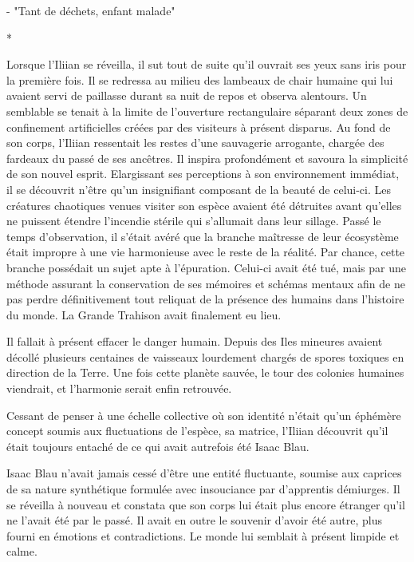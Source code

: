 \documentclass[12pt]{book}
\newcommand{\s}{\begin{center}
*
\end{center}
}
\begin{document}
- "Tant de déchets, enfant malade"

\s

Lorsque l'Iliian se réveilla, il sut tout de suite qu'il ouvrait ses yeux sans iris pour la première fois. Il se redressa au milieu des lambeaux de chair humaine qui lui avaient servi de paillasse durant sa nuit de repos et observa alentours. Un semblable se tenait à la limite de l'ouverture rectangulaire séparant deux zones de confinement artificielles créées par des visiteurs à présent disparus. Au fond de son corps, l'Iliian ressentait les restes d'une sauvagerie arrogante, chargée des fardeaux du passé de ses ancêtres. Il inspira profondément et savoura la simplicité de son nouvel esprit. Elargissant ses perceptions à son environnement immédiat, il se découvrit n'être qu'un insignifiant composant de la beauté de celui-ci. Les créatures chaotiques venues visiter son espèce avaient été détruites avant qu'elles ne puissent étendre l'incendie stérile qui s'allumait dans leur sillage. Passé le temps d'observation, il s’était avéré que la branche maîtresse de leur écosystème était impropre à une vie harmonieuse avec le reste de la réalité. Par chance, cette branche possédait un sujet apte à l'épuration. Celui-ci avait été tué, mais par une méthode assurant la conservation de ses mémoires et schémas mentaux afin de ne pas perdre définitivement tout reliquat de la présence des humains dans l'histoire du monde. La Grande Trahison avait finalement eu lieu.

Il fallait à présent effacer le danger humain. Depuis des Iles mineures avaient décollé plusieurs centaines de vaisseaux lourdement chargés de spores toxiques en direction de la Terre. Une fois cette planète sauvée, le tour des colonies humaines viendrait, et l'harmonie serait enfin retrouvée.


Cessant de penser à une échelle collective où son identité n'était qu'un éphémère concept soumis aux fluctuations de l'espèce, sa matrice, l'Iliian découvrit qu'il était toujours entaché de ce qui avait autrefois été Isaac Blau.


Isaac Blau n'avait jamais cessé d'être une entité fluctuante, soumise aux caprices de sa nature synthétique formulée avec insouciance par d'apprentis démiurges. Il se réveilla à nouveau et constata que son corps lui était plus encore étranger qu'il ne l'avait été par le passé. Il avait en outre le souvenir d'avoir été autre, plus fourni en émotions et contradictions. Le monde lui semblait à présent limpide et calme.
\end{document}
